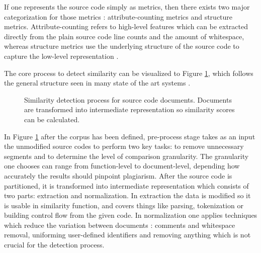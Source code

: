 If one represents the source code simply as metrics, then there exists two major categorization for those metrics \cite{Roy:2009:CEC:1530898.1531101}: attribute-counting metrics and structure metrics. Attribute-counting refers to high-level features which can be extracted directly from the plain source code \eg line counts and the amount of whitespace, whereas structure metrics use the underlying structure of the source code to capture the low-level representation \cite{Verco:1996:SDS:369585.369598}.


The core process to detect similarity can be visualized to Figure \ref{fig-sd-flow}, which follows the general structure seen in many state of the art systems \cite{Roy:2009:CEC:1530898.1531101}.

\begin{figure}[!ht]
\centering
\vspace{0.5cm}
\caption{Similarity detection process for source code documents. Documents are transformed into intermediate representation so similarity scores can be calculated.}
\label{fig-sd-flow}
\end{figure}

\noindent
In Figure \ref{fig-sd-flow} after the corpus has been defined, pre-process stage takes as an input the unmodified source codes to perform two key tasks: to remove unnecessary segments and to determine the level of comparison granularity. The granularity one chooses can range from function-level to document-level, depending how accurately the results should pinpoint plagiarism. After the source code is partitioned, it is transformed into intermediate representation which consists of two parts: extraction and normalization. In extraction the data is modified so it is usable in similarity function, and covers things like parsing, tokenization or building control flow from the given code. In normalization one applies techniques which reduce the variation between documents \cite{Roy:2009:CEC:1530898.1531101}: comments and whitespace removal, uniforming user-defined identifiers and removing anything which is not crucial for the detection process.

